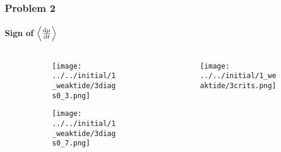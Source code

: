 \documentclass[dvipsnames, 11pt]{beamer}
\newcommand*{\rd}[2]{\frac{\mathrm{d}#1}{\mathrm{d}#2}}
\DeclarePairedDelimiter\ev{\langle}{\rangle}
\begin{document}
\begin{frame}
    \frametitle{Problem 2}
    \framesubtitle{Sign of $\ev*{\rd{\mu}{t}}$}

    \begin{columns}
        \begin{column}{0.5\textwidth}
            \begin{figure}[t]
                \centering
                \begin{subfigure}{0.8\columnwidth}
                    \centering
                    \texttt{[image: ../../initial/1\_weaktide/3diags0\_3.png]}
                \end{subfigure}
                \begin{subfigure}{0.8\columnwidth}
                    \centering
                    \texttt{[image: ../../initial/1\_weaktide/3diags0\_7.png]}
                \end{subfigure}
            \end{figure}
        \end{column}
        \begin{column}{0.5\textwidth}
            \begin{figure}[t]
                \centering
                \texttt{[image: ../../initial/1\_weaktide/3crits.png]}
            \end{figure}
        \end{column}
    \end{columns}
\end{frame}
\end{document}
